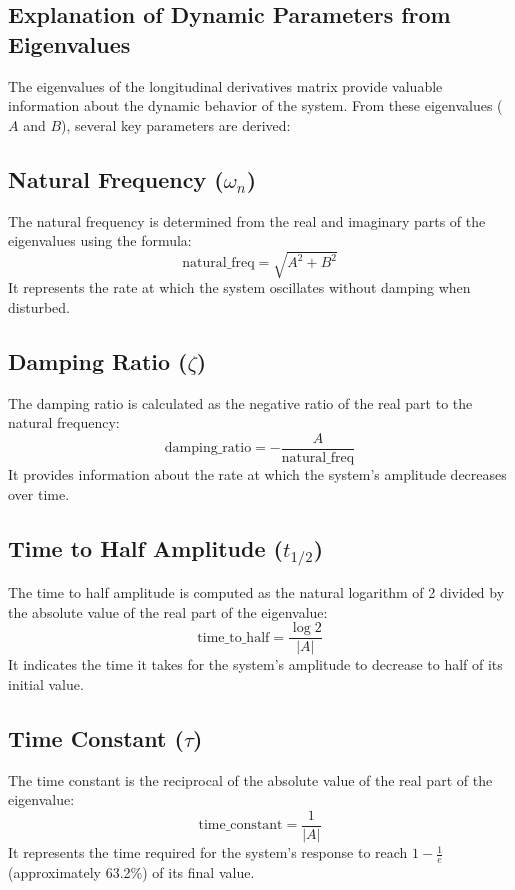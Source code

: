 \documentclass[a4paper, twoside]{article}
\begin{document}
\subsection{Explanation of Dynamic Parameters from Eigenvalues}

The eigenvalues of the longitudinal derivatives matrix provide valuable information about the dynamic behavior of the system. From these eigenvalues (\(A\) and \(B\)), several key parameters are derived:

\subsection*{Natural Frequency (\(\omega_n\))}

The natural frequency is determined from the real and imaginary parts of the eigenvalues using the formula:
\[ \text{natural\_freq} = \sqrt{A^2 + B^2} \]
It represents the rate at which the system oscillates without damping when disturbed.

\subsection*{Damping Ratio (\(\zeta\))}

The damping ratio is calculated as the negative ratio of the real part to the natural frequency:
\[ \text{damping\_ratio} = -\frac{A}{\text{natural\_freq}} \]
It provides information about the rate at which the system's amplitude decreases over time.

\subsection*{Time to Half Amplitude (\(t_{1/2}\))}

The time to half amplitude is computed as the natural logarithm of 2 divided by the absolute value of the real part of the eigenvalue:
\[ \text{time\_to\_half} = \frac{\log{2}}{\left|A\right|} \]
It indicates the time it takes for the system's amplitude to decrease to half of its initial value.

\subsection*{Time Constant (\(\tau\))}

The time constant is the reciprocal of the absolute value of the real part of the eigenvalue:
\[ \text{time\_constant} = \frac{1}{\left|A\right|} \]
It represents the time required for the system's response to reach \(1 - \frac{1}{e}\) (approximately 63.2\%) of its final value.
\end{document}
